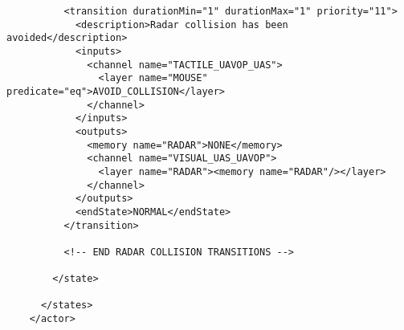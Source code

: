 \begin{verbatim}
          <transition durationMin="1" durationMax="1" priority="11">
            <description>Radar collision has been avoided</description>
            <inputs>
              <channel name="TACTILE_UAVOP_UAS">
                <layer name="MOUSE" predicate="eq">AVOID_COLLISION</layer>
              </channel>
            </inputs>
            <outputs>
              <memory name="RADAR">NONE</memory>
              <channel name="VISUAL_UAS_UAVOP">
                <layer name="RADAR"><memory name="RADAR"/></layer>
              </channel>
            </outputs>
            <endState>NORMAL</endState>
          </transition>
 
          <!-- END RADAR COLLISION TRANSITIONS -->

        </state>
        
      </states>
    </actor>
\end{verbatim}
